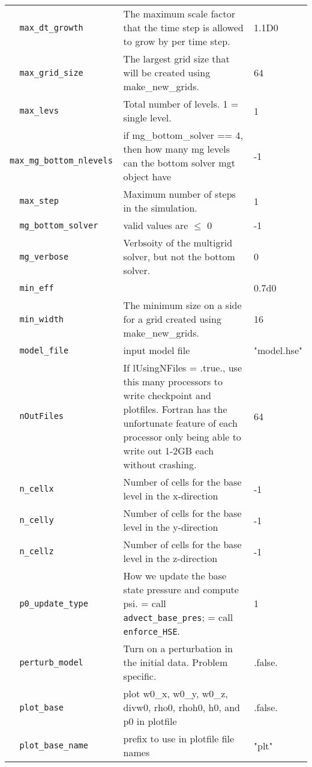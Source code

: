 {\begin{center}
\begin{longtable}{|l|p{3.25in}|l|}
\verb=  max_dt_growth  = &   The maximum scale factor that the time step is allowed to grow by per time step.  &  1.1D0 \\
\verb=  max_grid_size  = &    The largest grid size that will be created using make\_new\_grids.  &  64 \\
\verb=  max_levs  = &   Total number of levels.  1 = single level.  &  1 \\
\verb=  max_mg_bottom_nlevels  = &   if mg\_bottom\_solver == 4, then how many mg levels can the bottom solver mgt object have  &  -1 \\
\verb=  max_step  = &   Maximum number of steps in the simulation.  &  1 \\
\verb=  mg_bottom_solver  = &   valid values are $\le$ 0  &  -1 \\
\verb=  mg_verbose  = &   Verbsoity of the multigrid solver, but not the bottom solver.  &  0 \\
\verb=  min_eff  = &    &  0.7d0 \\
\verb=  min_width  = &   The minimum size on a side for a grid created using make\_new\_grids.  &  16 \\
\verb=  model_file  = &   input model file  &  "model.hse" \\
\verb=  nOutFiles  = &   If lUsingNFiles = .true., use this many processors to write checkpoint and plotfiles.  Fortran has the unfortunate feature of each processor only being able to write out 1-2GB each without crashing.  &  64 \\
\verb=  n_cellx  = &   Number of cells for the base level in the x-direction  &  -1 \\
\verb=  n_celly  = &   Number of cells for the base level in the y-direction  &  -1 \\
\verb=  n_cellz  = &   Number of cells for the base level in the z-direction  &  -1 \\
\verb=  p0_update_type  = &   How we update the base state pressure and compute psi. \newline 1 = call {\tt advect\_base\_pres}; \newline 2 = call {\tt enforce\_HSE}.  &  1 \\
\verb=  perturb_model  = &   Turn on a perturbation in the initial data.  Problem specific.  &  .false. \\
\verb=  plot_base  = &   plot w0\_x, w0\_y, w0\_z, divw0, rho0, rhoh0, h0, and p0 in plotfile  &  .false. \\
\verb=  plot_base_name  = &   prefix to use in plotfile file names  &  "plt" \\

\end{longtable}
\end{center}}
